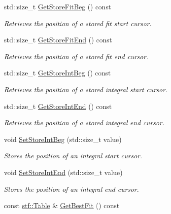 \begin{DoxyCompactItemize}
std::size\_\-t \hyperlink{classSection_a47a32db6afcdbc4a2e0f95d1f0e105cd}{GetStoreFitBeg} () const 
\begin{DoxyCompactList}\small\item\em Retrieves the position of a stored fit start cursor. \item\end{DoxyCompactList}\item 
std::size\_\-t \hyperlink{classSection_aaba1dbe7d8e1cd59f58358c77d81ff6e}{GetStoreFitEnd} () const 
\begin{DoxyCompactList}\small\item\em Retrieves the position of a stored fit end cursor. \item\end{DoxyCompactList}\item 
std::size\_\-t \hyperlink{classSection_a37c7ecd4475a602a94e21278a914244f}{GetStoreIntBeg} () const 
\begin{DoxyCompactList}\small\item\em Retrieves the position of a stored integral start cursor. \item\end{DoxyCompactList}\item 
std::size\_\-t \hyperlink{classSection_a4f694c6afc8423881230cafc2c336187}{GetStoreIntEnd} () const 
\begin{DoxyCompactList}\small\item\em Retrieves the position of a stored integral end cursor. \item\end{DoxyCompactList}\item 
void \hyperlink{classSection_a9b966152b6ec99ad02386505fddbe346}{SetStoreIntBeg} (std::size\_\-t value)
\begin{DoxyCompactList}\small\item\em Stores the position of an integral start cursor. \item\end{DoxyCompactList}\item 
void \hyperlink{classSection_a91ab67845b83473330f5a823e65da511}{SetStoreIntEnd} (std::size\_\-t value)
\begin{DoxyCompactList}\small\item\em Stores the position of an integral end cursor. \item\end{DoxyCompactList}\item 
const \hyperlink{classstf_1_1Table}{stf::Table} \& \hyperlink{classSection_a8a72a7c76100aba788e03e5e2bb1492d}{GetBestFit} () const 

\end{DoxyCompactItemize}
